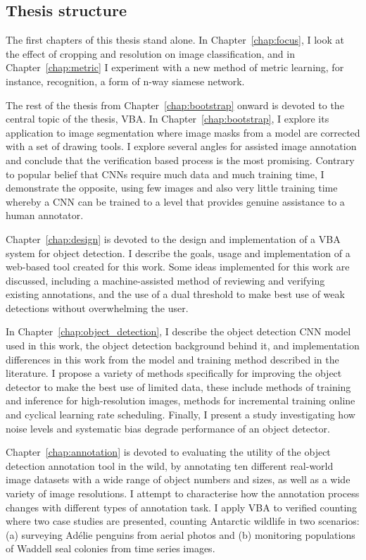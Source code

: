 \subsection {Thesis structure} 

The first chapters of this thesis stand alone. In Chapter~\ref{chap:focus}, I look at the effect of cropping and resolution on image classification, and in Chapter~\ref{chap:metric} I experiment with a new method of metric learning, for instance, recognition, a form of n-way siamese network. 

The rest of the thesis from Chapter~\ref{chap:bootstrap} onward is devoted to the central topic of the thesis, \gls{VBA}. In Chapter~\ref{chap:bootstrap}, I explore its application to image segmentation where image masks from a model are corrected with a set of drawing tools. I explore several angles for assisted image annotation and conclude that the verification based process is the most promising. Contrary to popular belief that \gls{CNN}s require much data and much training time, I demonstrate the opposite,  using few images and also very little training time whereby a \gls{CNN} can be trained to a level that provides genuine assistance to a human annotator. 

Chapter~\ref{chap:design} is devoted to the design and implementation of a \gls{VBA} system for object detection. I describe the goals, usage and implementation of a web-based tool created for this work. Some ideas implemented for this work are discussed, including a machine-assisted method of reviewing and verifying existing annotations, and the use of a dual threshold to make best use of weak detections without overwhelming the user.

In Chapter~\ref{chap:object_detection}, I describe the object detection \gls{CNN} model used in this work, the object detection background behind it, and implementation differences in this work from the model and training method described in the literature. I propose a variety of methods specifically for improving the object detector to make the best use of limited data, these include methods of training and inference for high-resolution images, methods for incremental training online and cyclical learning rate scheduling. Finally, I present a study investigating how noise levels and systematic bias degrade performance of an object detector. 

Chapter~\ref{chap:annotation} is devoted to evaluating the utility of the object detection annotation tool in the wild, by annotating ten different real-world image datasets with a wide range of object numbers and sizes, as well as a wide variety of image resolutions. I attempt to characterise how the annotation process changes with different types of annotation task. I apply \gls{VBA} to verified counting where two case studies are presented, counting Antarctic wildlife in two scenarios: (a) surveying Ad\'elie penguins from aerial photos and (b) monitoring populations of Waddell seal colonies from time series images.

